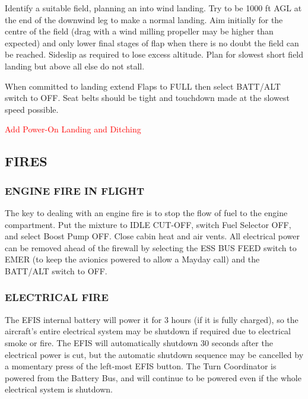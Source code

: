 Identify a suitable field, planning an into wind landing. Try to be
1000 ft AGL at the end of the downwind leg to make a normal landing.
Aim initially for the centre of the field (drag with a wind milling
propeller may be higher than expected) and only lower final stages
of flap when there is no doubt the field can be reached. Sideslip
as required to lose excess altitude. Plan for slowest short field
landing but above all else do not stall.

When committed to landing extend Flaps to FULL then select BATT/ALT switch to OFF. 
 Seat belts should be tight and touchdown made at the
slowest speed possible.

\textcolor{red}{Add Power-On Landing and Ditching}
\subsection{FIRES}
%
%

\subsubsection{ENGINE FIRE IN FLIGHT}

The key to dealing with an engine fire is to stop the flow of fuel
to the engine compartment. Put the mixture to IDLE CUT-OFF, switch
Fuel Selector OFF, and select Boost Pump OFF. Close cabin heat and
air vents. All electrical power can be removed ahead of the firewall
by selecting the ESS BUS FEED switch to EMER (to keep the avionics powered to allow a Mayday call) and the BATT/ALT switch to OFF.

\subsubsection{ELECTRICAL FIRE}

The EFIS internal battery will power it for 3 hours (if it is fully charged), so the aircraft's entire electrical system may be 
shutdown if required due to electrical smoke or fire.  The EFIS will automatically shutdown 30 seconds
after the electrical power is cut, but the automatic shutdown sequence may be cancelled by a momentary
press of the left-most EFIS button.  The Turn Coordinator is powered from the Battery Bus, 
and will continue to be powered even if the whole electrical system is shutdown.

